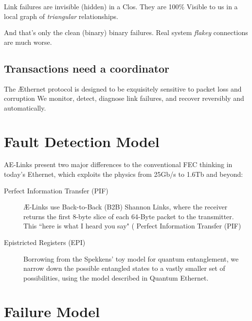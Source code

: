\documentclass[../HFT-main.tex]{subfiles}
\begin{document}
Link failures are invisible (hidden) in a Clos. They are 100\% Visible to us in a local graph of \emph{triangular} relationships.

And that's only the clean (binary) binary failures. Real system \emph{flakey} connections are much worse.

\subsection{Transactions need a coordinator\cite{Jim Gray}}

The Æthernet   protocol is designed to be exquisitely sensitive to packet loss and corruption We monitor, detect, diagnose link failures, and recover reversibly and automatically.


\newpage

\section{Fault Detection Model}


AE-Links present two major differences to the conventional FEC thinking in today's Ethernet, which exploits the physics from 25Gb/s to 1.6Tb and beyond:

\begin{description}
\item [Perfect Information Transfer (PIF)] Æ-Links use Back-to-Back (B2B) Shannon Links, where the receiver returns the first 8-byte slice of each 64-Byte packet to the transmitter. This ``here is what I heard you say" ( Perfect Information Transfer (PIF)\cite{Paper from Garner}

\item [Epistricted Registers (EPI)] Borrowing from the Spekkens' toy model for quantum entanglement, we narrow down the possible entangled states to a vastly smaller set of possibilities, using the model described in Quantum Ethernet\cite{Quantum Ethernet}.
\end{description}



\section{Failure Model}
\end{document}
